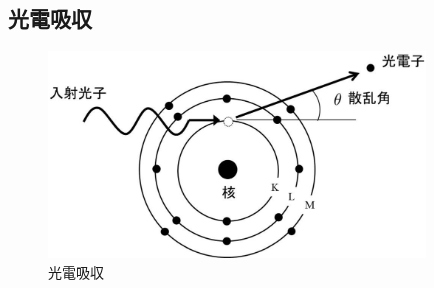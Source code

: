 \subsection{光電吸収}

\begin{figure}[H]
 \begin{center}
 \includegraphics[width=10cm]{image/other/photo_ab.eps}
 \end{center}
 \caption{光電吸収}
 \label{fig:photo_ab}
\end{figure}

